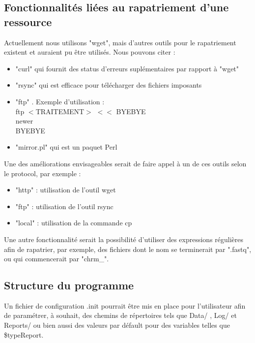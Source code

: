 \documentclass[a4paper,11pt]{article}
\begin{document}
	\subsection{Fonctionnalités liées au rapatriement d'une ressource}
		Actuellement nous utilisons "wget", mais d'autres outils pour le rapatriement existent et auraient pu être utilisés. Nous pouvons citer :
		\begin{itemize}
			\item "curl" qui fournit des status d'erreurs suplémentaires par rapport à "wget"
			\item "rsync" qui est efficace pour télécharger des fichiers imposants
			\item "ftp" . Exemple d'utilisation : \\ ftp $<$TRAITEMENT$>$ $<<$ BYEBYE \\ newer \\ BYEBYE
			\item "mirror.pl" qui est un paquet Perl
		\end{itemize}
		Une des améliorations envisageables serait de faire appel à un de ces outils selon le protocol, par exemple :
		\begin{itemize}
			\item "http" : utilisation de l'outil wget
			\item "ftp" : utilisation de l'outil rsync
			\item "local" : utilisation de la commande cp
		\end{itemize}
		Une autre fonctionnalité serait la possibilité d'utiliser des expressions régulières afin de rapatrier, par exemple, des fichiers dont le nom se terminerait par ".fastq", ou qui commencerait par "chrm\_".

	\subsection{Structure du programme}
		Un fichier de configuration .init pourrait être mis en place pour l'utilisateur afin de paramétrer, à souhait, des chemins de répertoires tels que Data/ , Log/ et Reports/  ou bien aussi des valeurs par défault pour des variables telles que \$typeReport.
		
	
\end{document}
